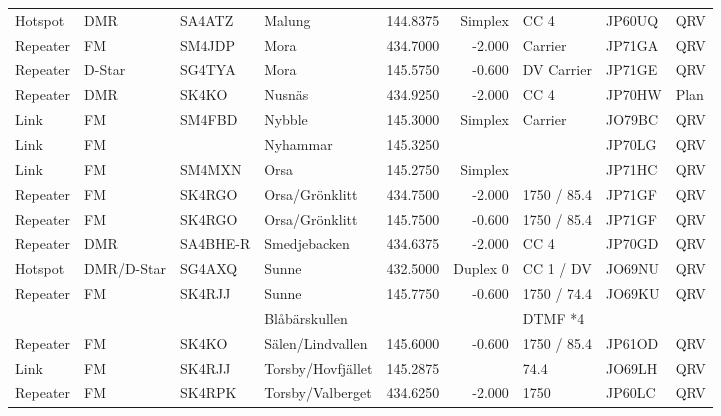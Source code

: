 \begin{landscape}
\begin{longtable}{llllrrlll}
Hotspot  & DMR        & SA4ATZ   & Malung              & 144.8375     & Simplex    & CC 4          & JP60UQ      & QRV      \\
Repeater & FM         & SM4JDP   & Mora                & 434.7000     & -2.000     & Carrier       & JP71GA      & QRV      \\
Repeater & D-Star     & SG4TYA   & Mora                & 145.5750     & -0.600     & DV Carrier    & JP71GE      & QRV      \\
Repeater & DMR        & SK4KO    & Nusnäs              & 434.9250     & -2.000     & CC 4          & JP70HW      & Plan     \\
Link     & FM         & SM4FBD   & Nybble              & 145.3000     & Simplex    & Carrier       & JO79BC      & QRV      \\
Link     & FM         &          & Nyhammar            & 145.3250     &            &               & JP70LG      & QRV      \\
Link     & FM         & SM4MXN   & Orsa                & 145.2750     & Simplex    &               & JP71HC      & QRV      \\
Repeater & FM         & SK4RGO   & Orsa/Grönklitt      & 434.7500     & -2.000     & 1750 / 85.4   & JP71GF      & QRV      \\
Repeater & FM         & SK4RGO   & Orsa/Grönklitt      & 145.7500     & -0.600     & 1750 / 85.4   & JP71GF      & QRV      \\
Repeater & DMR        & SA4BHE-R & Smedjebacken        & 434.6375     & -2.000     & CC 4          & JP70GD      & QRV      \\
Hotspot  & DMR/D-Star & SG4AXQ   & Sunne               & 432.5000     & Duplex 0   & CC 1 / DV     & JO69NU      & QRV      \\
Repeater & FM         & SK4RJJ   & Sunne               & 145.7750     & -0.600     & 1750 / 74.4   & JO69KU      & QRV      \\
         &            &          & Blåbärskullen       &              &            & DTMF *4       &             &          \\
Repeater & FM         & SK4KO    & Sälen/Lindvallen    & 145.6000     & -0.600     & 1750 / 85.4   & JP61OD      & QRV      \\
Link     & FM         & SK4RJJ   & Torsby/Hovfjället   & 145.2875     &            & 74.4          & JO69LH      & QRV      \\
Repeater & FM         & SK4RPK   & Torsby/Valberget    & 434.6250     & -2.000     & 1750          & JP60LC      & QRV      \\

\end{longtable}
\end{landscape}
